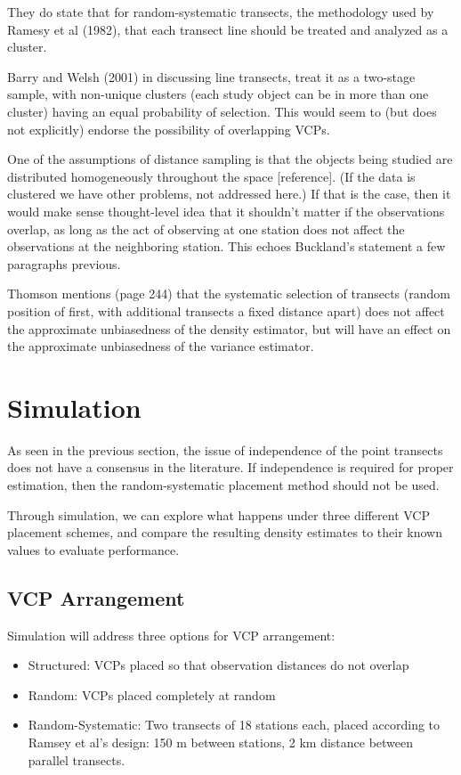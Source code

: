 \documentclass[12pt]{article}
\begin{document}
They do state that for random-systematic transects, the methodology used by Ramesy et al (1982), that each transect line should be treated and analyzed as a cluster.

Barry and Welsh (2001) in discussing line transects, treat it as a two-stage sample, with non-unique clusters (each study object can be in more than one cluster) having an equal probability of selection. This would seem to (but does not explicitly) endorse the possibility of overlapping VCPs. 

One of the assumptions of distance sampling is that the objects being studied are distributed homogeneously throughout the space [reference].  (If the data is clustered we have other problems, not addressed here.) If that is the case, then it would make sense thought-level idea that it shouldn't matter if the observations overlap, as long as the act of observing at one station does not affect the observations at the neighboring station. This echoes Buckland’s statement a few paragraphs previous.

Thomson mentions (page 244) that the systematic selection of transects (random position of first, with additional transects a fixed distance apart) does not affect the approximate unbiasedness of the density estimator, but will have an effect on the approximate unbiasedness of the variance estimator. 

\section{Simulation}
As seen in the previous section, the issue of independence of the point transects does not have a consensus in the literature. If independence is required for proper estimation, then the random-systematic placement method should not be used. 

Through simulation, we can explore what happens under three different VCP placement schemes, and compare the resulting density estimates to their known values to evaluate performance.

\subsection{VCP Arrangement}
Simulation will address three options for VCP arrangement:
\begin{itemize}
\item Structured: VCPs placed so that observation distances do not overlap
\item Random: VCPs placed completely at random
\item Random-Systematic: Two transects of 18 stations each, placed according to Ramsey et al's design: 150 m between stations, 2 km distance between parallel transects.
\end{itemize}
\end{document}
